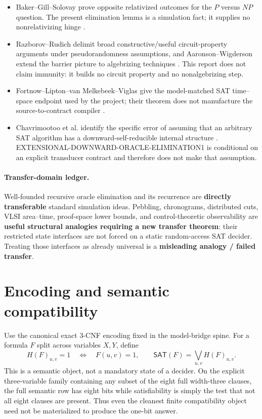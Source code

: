 \documentclass[11pt]{article}
\newcommand{\SAT}{\mathsf{SAT}}
\begin{document}
\begin{itemize}
\item Baker--Gill--Solovay prove opposite relativized outcomes for the
$P$ versus $NP$ question.  The present elimination lemma is a simulation fact;
it supplies no nonrelativizing hinge \cite{BGS75}.
\item Razborov--Rudich delimit broad constructive/useful circuit-property
arguments under pseudorandomness assumptions, and Aaronson--Wigderson extend
the barrier picture to algebrizing techniques \cite{RR97,AW09}.  This report
does not claim immunity: it builds no circuit property and no nonalgebrizing
step.
\item Fortnow--Lipton--van Melkebeek--Viglas give the model-matched SAT
time--space endpoint used by the project; their theorem does not manufacture
the source-to-contract compiler \cite{FLMV05}.
\item Chavrimootoo et al. identify the specific error of assuming that an
arbitrary SAT algorithm has a downward-self-reducible internal structure
\cite{CHKKN23}.  EXTENSIONAL-DOWNWARD-ORACLE-ELIMINATION1 is conditional on an
explicit transducer contract and therefore does not make that assumption.
\end{itemize}

\paragraph{Transfer-domain ledger.}
Well-founded recursive oracle elimination and its recurrence are
\textbf{directly transferable} standard simulation ideas.  Pebbling,
chronograms, distributed cuts, VLSI area--time, proof-space lower bounds, and
control-theoretic observability are \textbf{useful structural analogies requiring
a new transfer theorem}: their restricted state interfaces are not forced on a
static random-access SAT decider.  Treating those interfaces as already
universal is a \textbf{misleading analogy / failed transfer}.

\section{Encoding and semantic compatibility}

Use the canonical exact 3-CNF encoding fixed in the model-bridge spine.  For a
formula $F$ split across variables $X,Y$, define
\[
 H(F)_{u,v}=1 \quad\Longleftrightarrow\quad F(u,v)=1,
 \qquad
 \SAT(F)=\bigvee_{u,v}H(F)_{u,v}.
\]
This is a semantic object, not a mandatory state of a decider.  On the explicit
three-variable family containing any subset of the eight full width-three
clauses, the full semantic row has eight bits while satisfiability is simply
the test that not all eight clauses are present.  Thus even the cleanest finite
compatibility object need not be materialized to produce the one-bit answer.
\end{document}
